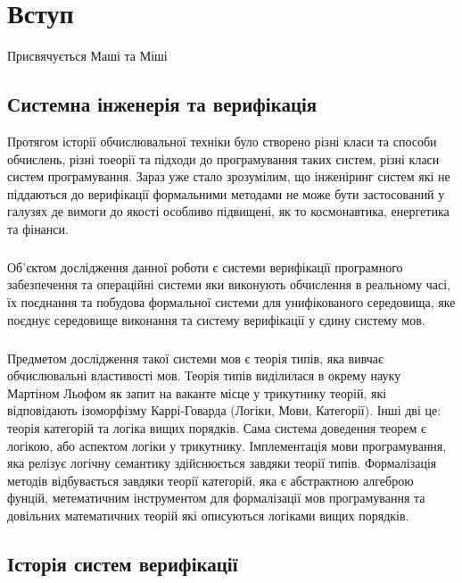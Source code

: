 \chapter{Вступ}

\epigraph{Присвячується Маші та Міші}{}

\section{Системна інженерія та верифікація}

    Протягом історії обчислювальної техніки було створено різні класи та способи обчислень,
    різні тоеорії та підходи до програмування таких систем, різні класи систем програмування.
    Зараз уже стало зрозумілим, що інженіринг систем які не піддаються до верифікації
    формальними методами не може бути застосований у галузях де вимоги до якості
    особливо підвищені, як то космонавтика, енергетика та фінанси.

    \paragraph{}
    Об'єктом дослідження данної роботи є системи верифікації програмного забезпечення
    та операційні системи яки виконують обчислення в реальному часі, їх поєднання
    та побудова формальної системи для унифікованого середовища, яке поєднує
    середовище виконання та систему верифікації у єдину систему мов.

    \paragraph{}
    Предметом дослідження такої системи мов є теорія типів, яка вивчає обчислювальні властивості мов.
    Теорія типів виділилася в окрему науку Мартіном Льофом як запит на ваканте місце у
    трикутнику теорій, які відповідають ізоморфізму Каррі-Говарда (Логіки, Мови, Категорії).
    Інші дві це: теорія категорій та логіка вищих порядків. Сама система доведення теорем є
    логікою, або аспектом логіки у трикутнику. Імплементація мови програмування,
    яка релізує логічну семантику здійснюється завдяки теорії типів. Формалізація методів
    відбувається завдяки теорії категорій, яка є абстрактною алгеброю фунцій,
    метематичним інструментом для формалізації мов програмування та довільних
    математичних теорій які описуються логіками вищих порядків.

\newpage
\section{Історія систем верифікації}

